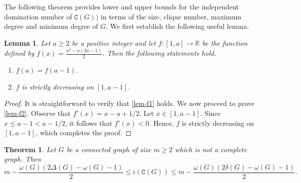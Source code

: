 \documentclass[12pt]{article}
\newtheorem{lemma}[remark]{Lemma}
\newtheorem{theorem}[remark]{Theorem}
\begin{document}
\noindent
The following theorem provides lower and upper bounds for the independent domination number of $\mathtt{C}(G))$ in terms of the size, clique number, maximum degree and minimum degree of $G$. We first establish the following useful lemma.

\begin{lemma}\label{lem-f}
Let $a\geq 2$ be a positive integer and let $f: [1,a] \to \mathbb{R}$ be the function defined by $f(x) = \frac{x^2-x(2a-1)}{2}$. Then the following statements hold.
\begin{enumerate}[label={\rm(\roman*)}]
\item \label{lem-f1} $f(a) = f(a-1)$.
\item \label{lem-f2} $f$ is strictly decreasing on $[1,a-1]$.
\end{enumerate}
\end{lemma}

\begin{proof}
It is straightforward to verify that \ref{lem-f1} holds. We now proceed to prove \ref{lem-f2}. Observe that $f'(x) = x-a+1/2$. Let $x\in[1, a-1]$. Since $x\leq a-1 < a - 1/2$, it follows that $f'(x)<0$. Hence, $f$ is strictly decreasing on $[1,a-1]$, which completes the proof.
\end{proof}

\begin{theorem}\label{theo-lower-upper-bounds}
Let $G$ be a connected graph of size $m\geq 2$ which is not a complete graph. Then
$$m- \frac{\omega(G)(2\Delta(G)-\omega(G)-1)}{2}\leq i(\mathtt{C}(G))\leq m- \frac{\omega(G)(2\delta(G)-\omega(G)-1)}{2}.$$
\end{theorem}
\end{document}
